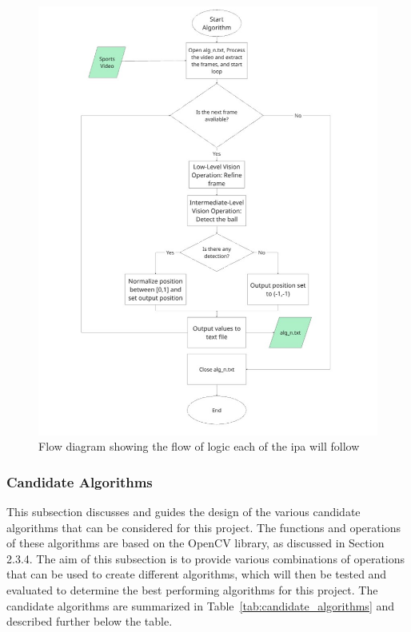 \documentclass[12pt,a4paper]{article}
\begin{document}
\begin{figure}[H]
	\centering
	\includegraphics[width=\textwidth]{ipa_flow.jpg}
	\caption{Flow diagram showing the flow of logic each of the \acs{ipa} will follow}
	\label{fig:ipaflow}
\end{figure}

\subsubsection{Candidate Algorithms}
This subsection discusses and guides the design of the various candidate algorithms that can be considered for this project. The functions and operations of these algorithms are based on the OpenCV library, as discussed in Section 2.3.4. The aim of this subsection is to provide various combinations of operations that can be used to create different algorithms, which will then be tested and evaluated to determine the best performing algorithms for this project. The candidate algorithms are summarized in Table~\ref{tab:candidate_algorithms} and described further below the table.
\end{document}

